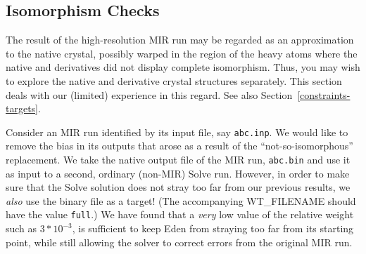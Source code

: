 \documentclass{report}
\begin{document}
\subsection {Isomorphism Checks}
\label{mir-solve-isomorphism}

The result of the high-resolution MIR run may be regarded as an
approximation to the native crystal, possibly warped in the region of 
the heavy atoms where the native and derivatives did not display complete
isomorphism.  Thus, 
you may wish to explore the native and derivative crystal structures 
separately.  This section deals with our (limited) experience in this regard.
See also Section~\ref{constraints-targets}.

\vspace {0.1in}

Consider an MIR run identified by its input file, say {\tt abc.inp}.
We would like to remove the bias in its outputs that arose
as a result of the ``not-so-isomorphous'' replacement.
We take the native output file of the MIR run, {\tt abc.bin}
and use it as input to a second, ordinary (non-MIR) Solve run.  
However, in order to make sure that the Solve solution does not stray too far
from our previous results, we {\em also} use the binary file as a target!  
(The accompanying WT\_FILENAME should have the value {\tt full}.)
We have found that a {\em very}
low value of the relative weight such as $3*10^{-3}$, 
is sufficient to keep Eden from straying too far
from its starting point, while still allowing the solver to correct errors
from the original MIR run.

\vspace {0.1in}
\end{document}
